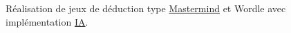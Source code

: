 Réalisation de jeux de déduction type \mbox{\hyperlink{classMastermind}{Mastermind}} et Wordle avec implémentation \mbox{\hyperlink{classIA}{IA}}. 